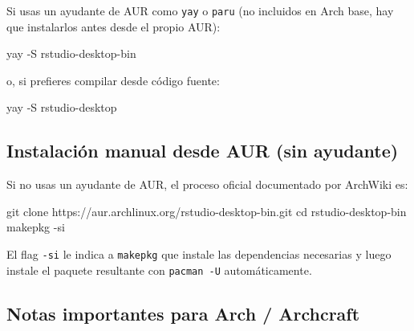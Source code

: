 \documentclass[
  man,
  floatsintext,
  longtable,
  a4paper,
  nolmodern,
  notxfonts,
  notimes,
  12pt,
  colorlinks=true,linkcolor=blue,citecolor=blue,urlcolor=blue]{apa7}
\newenvironment{Shaded}{\begin{snugshade}}{\end{snugshade}}
\newcommand{\AttributeTok}[1]{\textcolor[rgb]{0.40,0.45,0.13}{#1}}
\newcommand{\BuiltInTok}[1]{\textcolor[rgb]{0.00,0.23,0.31}{#1}}
\newcommand{\ExtensionTok}[1]{\textcolor[rgb]{0.00,0.23,0.31}{#1}}
\newcommand{\FunctionTok}[1]{\textcolor[rgb]{0.28,0.35,0.67}{#1}}
\newcommand{\NormalTok}[1]{\textcolor[rgb]{0.00,0.23,0.31}{#1}}
\begin{document}
Si usas un ayudante de AUR como \texttt{yay} o \texttt{paru} (no
incluidos en Arch base, hay que instalarlos antes desde el propio AUR):

\begin{Shaded}
\begin{Highlighting}[]
\ExtensionTok{yay} \AttributeTok{{-}S}\NormalTok{ rstudio{-}desktop{-}bin}
\end{Highlighting}
\end{Shaded}

o, si prefieres compilar desde código fuente:

\begin{Shaded}
\begin{Highlighting}[]
\ExtensionTok{yay} \AttributeTok{{-}S}\NormalTok{ rstudio{-}desktop}
\end{Highlighting}
\end{Shaded}

\subsection{Instalación manual desde AUR (sin
ayudante)}\label{instalaciuxf3n-manual-desde-aur-sin-ayudante}

Si no usas un ayudante de AUR, el proceso oficial documentado por
ArchWiki es:

\begin{Shaded}
\begin{Highlighting}[]
\FunctionTok{git}\NormalTok{ clone https://aur.archlinux.org/rstudio{-}desktop{-}bin.git}
\BuiltInTok{cd}\NormalTok{ rstudio{-}desktop{-}bin}
\ExtensionTok{makepkg} \AttributeTok{{-}si}
\end{Highlighting}
\end{Shaded}

El flag \texttt{-si} le indica a \texttt{makepkg} que instale las
dependencias necesarias y luego instale el paquete resultante con
\texttt{pacman\ -U} automáticamente.

\subsection{Notas importantes para Arch /
Archcraft}\label{notas-importantes-para-arch-archcraft}
\end{document}
